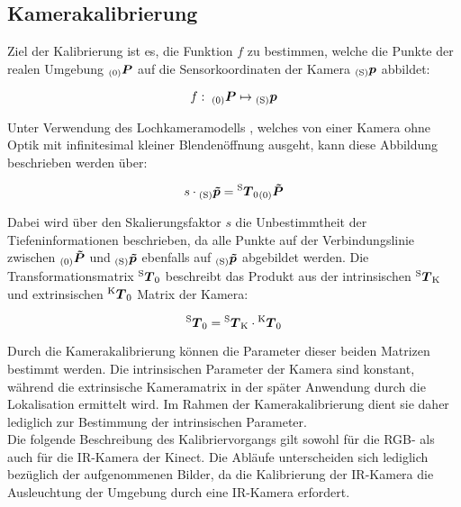 \subsection{Kamerakalibrierung}
Ziel der Kalibrierung ist es, die Funktion $f$ zu bestimmen, welche die Punkte der realen Umgebung ${_{{\mathrm{(0)}}}}\mbox{\boldmath{$P$}}$ auf die Sensorkoordinaten der Kamera ${_{{\mathrm{(S)}}}}\mbox{\boldmath{$p$}}$ abbildet:

\begin{equation}
f : \; {_{{\mathrm{(0)}}}}\mbox{\boldmath{$P$}} \mapsto {_{{\mathrm{(S)}}}}\mbox{\boldmath{$p$}}
\end{equation}

Unter Verwendung des Lochkameramodells , welches von einer Kamera ohne Optik mit infinitesimal kleiner Blendenöffnung ausgeht, kann diese Abbildung beschrieben werden über:

\begin{equation}
s \cdot {_{{\mathrm{(S)}}}}\mbox{\boldmath{$\tilde{p}$}} = {^{\mathrm{S}}\mbox{\boldmath{$T$}}_{\mathrm{0}}}{_{{\mathrm{(0)}}}}\mbox{\boldmath{$\tilde{P}$}}
\label{eq.persp_abb}
\end{equation}

Dabei wird über den Skalierungsfaktor $s$ die Unbestimmtheit der Tiefeninformationen beschrieben, da alle Punkte auf der Verbindungslinie zwischen ${_{{\mathrm{(0)}}}}\mbox{\boldmath{$\tilde{P}$}}$ und ${_{{\mathrm{(S)}}}}\mbox{\boldmath{$\tilde{p}$}}$ ebenfalls auf ${_{{\mathrm{(S)}}}}\mbox{\boldmath{$\tilde{p}$}}$ abgebildet werden. 
%
Die Transformationsmatrix ${^{\mathrm{S}}\mbox{\boldmath{$T$}}_{\mathrm{0}}}$ beschreibt das Produkt aus der intrinsischen ${^{\mathrm{S}}\mbox{\boldmath{$T$}}_{\mathrm{K}}}$ und extrinsischen ${^{\mathrm{K}}\mbox{\boldmath{$T$}}_{\mathrm{0}}}$ Matrix der Kamera:

\begin{equation}
{^{\mathrm{S}}\mbox{\boldmath{$T$}}_{\mathrm{0}}} = {^{\mathrm{S}}\mbox{\boldmath{$T$}}_{\mathrm{K}}} \cdot {^{\mathrm{K}}\mbox{\boldmath{$T$}}_{\mathrm{0}}}
\end{equation}

Durch die Kamerakalibrierung können die Parameter dieser beiden Matrizen bestimmt werden. Die intrinsischen Parameter der Kamera sind konstant, während die extrinsische Kameramatrix in der später Anwendung durch die Lokalisation ermittelt wird. Im Rahmen der Kamerakalibrierung dient sie daher lediglich zur Bestimmung der intrinsischen Parameter.\\
Die folgende Beschreibung des Kalibriervorgangs gilt sowohl für die RGB- als auch für die IR-Kamera der Kinect. Die Abläufe unterscheiden sich lediglich bezüglich der aufgenommenen Bilder, da die Kalibrierung der IR-Kamera die Ausleuchtung der Umgebung durch eine IR-Kamera erfordert.


